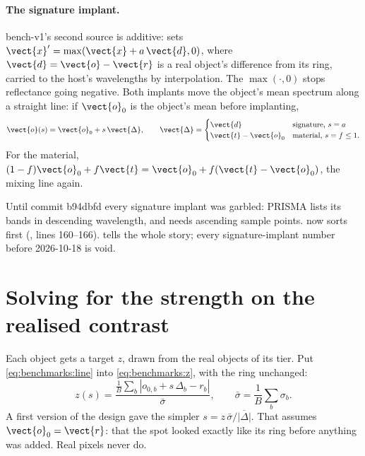 \paragraph{The signature implant.} bench-v1's second source is additive:  sets
$\vect{x}' = \max(\vect{x} + a\,\vect{d}, 0)$, where $\vect{d} = \vect{o} - \vect{r}$ is a real object's difference
from its ring, carried to the host's wavelengths by interpolation. The $\max(\cdot, 0)$ stops reflectance going
negative. Both implants move the object's mean spectrum along a straight line: if $\vect{o}_0$ is the object's mean
before implanting,
\begin{equation}\label{eq:benchmarks:line}
\vect{o}(s) = \vect{o}_0 + s\,\vect{\Delta}, \qquad
\vect{\Delta} = \begin{cases} \vect{d} & \text{signature, } s = a\\ \vect{t} - \vect{o}_0 & \text{material, } s = f \le 1. \end{cases}
\end{equation}
For the material, $(1 - f)\vect{o}_0 + f\vect{t} = \vect{o}_0 + f(\vect{t} - \vect{o}_0)$, the mixing line again.

\begin{sourcenote}
Until commit b94dbfd every signature implant was garbled: PRISMA lists its bands in descending wavelength, and
 needs ascending sample points.  now sorts first (,
lines 160--166).  tells the whole story; every signature-implant number before 2026-10-18 is void.
\end{sourcenote}

\section{Solving for the strength on the realised contrast}\label{sec:benchmarks:solve}

Each object gets a target $z$, drawn from the real objects of its tier. Put \cref{eq:benchmarks:line} into
\cref{eq:benchmarks:z}, with the ring unchanged:
\begin{equation}\label{eq:benchmarks:zs}
z(s) = \frac{\frac1B\sum_b |o_{0,b} + s\,\Delta_b - r_b|}{\bar\sigma}, \qquad \bar\sigma = \frac1B\sum_b \sigma_b.
\end{equation}
A first version of the design gave the simpler $s = z\,\bar\sigma / \overline{|\Delta|}$. That assumes $\vect{o}_0 =
\vect{r}$: that the spot looked exactly like its ring before anything was added. Real pixels never do.

